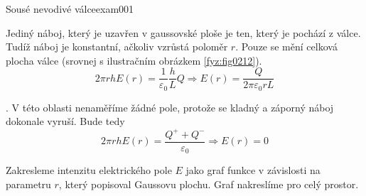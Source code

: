 \begin{fyzexam}{Sousé nevodivé válce}{exam001}
\begin{description}[leftmargin=0em,labelindent=0em, style=nextline]
            Jediný náboj, který je uzavřen v gaussovské ploše je ten, který je pochází z
             válce. Tudíž náboj je konstantní, ačkoliv vzrůstá poloměr \(r\). Pouze
            se mění celková plocha válce (srovnej s ilustračním obrázkem \ref{fyz:fig0212}).
            \begin{equation*}
              2\pi rhE(r) = \frac{1}{\varepsilon_0}\dfrac{h}{L}Q 
              \Rightarrow E(r) = \frac{Q}{2\pi\varepsilon_0rL}
            \end{equation*}
      \item[\emph{E(r) pro oblast pro oblast r > b?}].  V této oblasti nenaměříme žádné pole,
            protože se kladný a záporný náboj dokonale vyruší. Bude tedy 
            \begin{equation*}
              2\pi r h E(r) = \dfrac{Q^+ + Q^-}{\varepsilon_0}        \Rightarrow 
                       E(r) = 0
            \end{equation*}
    \end{description}      
    
    Zakresleme intenzitu elektrického pole \(E\) jako graf funkce v závislosti na parametru \(r\),
    který popisoval Gaussovu plochu. Graf nakreslíme pro celý prostor. 
            
    {\centering
      \captionsetup{type=figure}
    \par}


\end{fyzexam}
